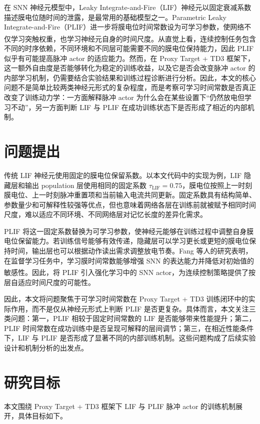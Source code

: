 \documentclass[UTF8,zihao=-4,oneside,openany]{ctexbook}
\let\oldcite\cite
\renewcommand{\cite}[1]{\textsuperscript{\oldcite{#1}}}
\begin{document}
在 SNN 神经元模型中，Leaky Integrate-and-Fire（LIF）神经元以固定衰减系数描述膜电位随时间的泄露，是最常用的基础模型之一。Parametric Leaky Integrate-and-Fire（PLIF）进一步将膜电位时间常数设为可学习参数，使网络不仅学习突触权重，也学习神经元自身的时间尺度\cite{fang2021plif}。从直觉上看，连续控制任务包含不同的时序依赖，不同环境和不同层可能需要不同的膜电位保持能力，因此 PLIF 似乎有可能提高脉冲 actor 的适应能力。然而，在 Proxy Target + TD3 框架下，这一额外自由度是否能够转化为稳定的训练收益，以及它是否会改变脉冲 actor 的内部学习机制，仍需要结合实验结果和训练过程诊断进行分析。因此，本文的核心问题不是简单比较两类神经元形式的复杂程度，而是考察可学习时间常数是否真正改变了训练动力学：一方面解释脉冲 actor 为什么会在某些设置下“仍然放电但学习不动”，另一方面判断 LIF 与 PLIF 在成功训练状态下是否形成了相近的内部机制。

\section{问题提出}
传统 LIF 神经元使用固定的膜电位保留系数。以本文代码中的实现为例，LIF 隐藏层和输出 population 层使用相同的固定系数 $\tau_{\mathrm{LIF}}=0.75$，膜电位按照上一时刻膜电位、上一时刻脉冲重置项和当前输入电流共同更新。固定系数具有结构简单、参数量少和可解释性较强等优点，但也意味着网络各层在训练前就被赋予相同时间尺度，难以适应不同环境、不同网络层对记忆长度的差异化需求。

PLIF 将这一固定系数替换为可学习参数，使神经元能够在训练过程中调整自身膜电位保留能力。若训练信号能够有效传递，隐藏层可以学习更长或更短的膜电位保持时间，输出层也可以根据动作读出需求调整放电节奏。Fang 等人的研究表明，在监督学习任务中，学习膜时间常数能够增强 SNN 的表达能力并降低对初始值的敏感性\cite{fang2021plif}。因此，将 PLIF 引入强化学习中的 SNN actor，为连续控制策略提供了按层自适应时间尺度的可能性。

因此，本文将问题聚焦于可学习时间常数在 Proxy Target + TD3 训练闭环中的实际作用，而不是仅从神经元形式上判断 PLIF 是否更复杂。具体而言，本文关注三类问题：第一，PLIF 相较于固定时间常数的 LIF 是否能够带来性能提升；第二，PLIF 时间常数在成功训练中是否呈现可解释的层间调节；第三，在相近性能条件下，LIF 与 PLIF 是否形成了显著不同的内部训练机制。这些问题构成了后续实验设计和机制分析的出发点。

\section{研究目标}
本文围绕 Proxy Target + TD3 框架下 LIF 与 PLIF 脉冲 actor 的训练机制展开，具体目标如下。
\end{document}
